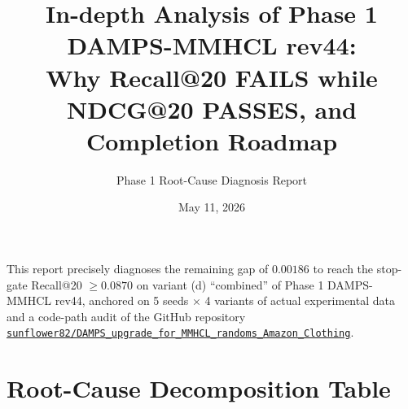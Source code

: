 \documentclass[11pt,a4paper]{article}
\title{\textbf{In-depth Analysis of Phase 1 DAMPS-MMHCL rev44:\\
Why Recall@20 FAILS while NDCG@20 PASSES, and Completion Roadmap}}
\author{Phase 1 Root-Cause Diagnosis Report}
\date{May 11, 2026}
\begin{document}
\maketitle

\begin{mdframed}[backgroundcolor=backcolour, linecolor=codegray, linewidth=0.5pt]
This report precisely diagnoses the remaining gap of $0.00186$ to reach the
stop-gate Recall@20 $\geq 0.0870$ on variant (d) ``combined'' of Phase 1
DAMPS-MMHCL rev44, anchored on 5 seeds $\times$ 4 variants of actual
experimental data and a code-path audit of the GitHub repository
\href{https://github.com/sunflower82/DAMPS_upgrade_for_MMHCL_randoms_Amazon_Clothing}{\texttt{sunflower82/DAMPS\_upgrade\_for\_MMHCL\_randoms\_Amazon\_Clothing}}.
\end{mdframed}

\section{Root-Cause Decomposition Table}
\end{document}
